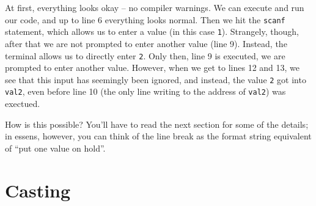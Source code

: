 At first, everything looks okay -- no compiler warnings. We can execute and run our code, and up to line 6 everything looks normal. Then we hit the \texttt{scanf} statement, which allows us to enter a value (in this case \texttt{1}). Strangely, though, after that we are not prompted to enter another value (line 9). Instead, the terminal allows us to directly enter \texttt{2}. Only then, line 9 is executed, \ie we are prompted to enter another value. However, when we get to lines 12 and 13, we see that this input has seemingly been ignored, and instead, the value \texttt{2} got into \texttt{val2}, even before line 10 (the only line writing to the address of \texttt{val2}) was exectued.

How is this possible? You'll have to read the next section for some of the details; in essens, however, you can think of the line break as the format string equivalent of \enquote{put one value on hold}. 





\section{Casting}





